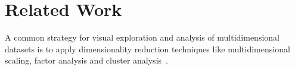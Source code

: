 \section{Related Work}

A common strategy for visual exploration and analysis of multidimensional datasets is to apply dimensionality reduction techniques like multidimensional scaling, factor analysis and cluster analysis~\cite{Yang2003}. 

